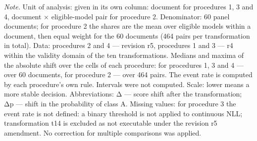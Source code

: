 \begin{minipage}{\linewidth}\footnotesize\vspace{2pt}
\textit{Note.} Unit of analysis: given in its own column: document for procedures 1, 3 and 4, document × eligible-model pair for procedure 2. Denominator: 60 panel documents; for procedure 2 the shares are the mean over eligible models within a document, then equal weight for the 60 documents (464 pairs per transformation in total). Data: procedures 2 and 4 — revision r5, procedures 1 and 3 — r4 within the validity domain of the ten transformations. Medians and maxima of the absolute shift over the cells of each procedure: for procedures 1, 3 and 4 — over 60 documents, for procedure 2 — over 464 pairs. The event rate is computed by each procedure's own rule. Intervals were not computed. Scale: lower means a more stable decision. Abbreviations: Δ — score shift after the transformation; Δp — shift in the probability of class A. Missing values: for procedure 3 the event rate is not defined: a binary threshold is not applied to continuous NLL; transformation t14 is excluded as not executable under the revision r5 amendment. No correction for multiple comparisons was applied.
\end{minipage}
\endgroup
